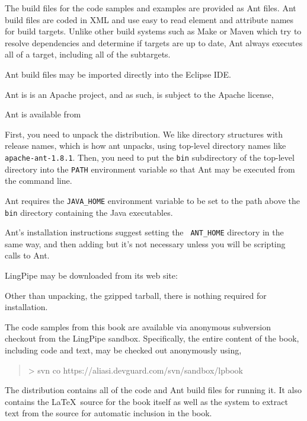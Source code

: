 
\noindent
The build files for the code samples and examples are provided as Ant
files.  Ant build files are coded in XML and use easy to read element
and attribute names for build targets.  Unlike other build systems
such as Make or Maven which try to resolve dependencies and determine
if targets are up to date, Ant always executes all of a target,
including all of the subtargets.

Ant build files may be imported directly into the Eclipse IDE.

Ant is is an Apache project, and as such, is subject to the Apache license,
\begin{quote}
\end{quote}

Ant is available from 

\begin{quote}
\end{quote}

First, you need to unpack the distribution.  We like directory
structures with release names, which is how ant unpacks, using
top-level directory names like {\tt apache-ant-1.8.1}.  Then, you need
to put the {\tt bin} subdirectory of the top-level directory into the
{\tt PATH} environment variable so that Ant may be executed from the
command line.

Ant requires the {\tt JAVA\_HOME} environment variable to be set to
the path above the {\tt bin} directory containing the Java
executables.  

Ant's installation instructions suggest setting the {\tt
ANT\_HOME} directory in the same way, and then adding but it's not necessary unless
you will be scripting calls to Ant.



\noindent
LingPipe may be downloaded from its web site:
%
\begin{quote}
\end{quote}
%
Other than unpacking, the gzipped tarball, there is nothing required
for installation.



\noindent
The code samples from this book are available via anonymous subversion checkout
from the LingPipe sandbox.  Specifically, the entire content of the book,
including code and text, may be checked out anonymously using,

\begin{quote}
{\small\ttfamily
> svn co https://aliasi.devguard.com/svn/sandbox/lpbook
}
\end{quote}
%
The distribution contains all of the code and Ant build files for
running it.  It also contains the \LaTeX\ source for the book itself
as well as the system to extract text from the source for automatic
inclusion in the book.
